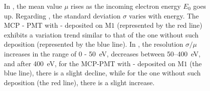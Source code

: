 \begin{figure}[!ht]
\begin{subfigure}[b]{0.5\textwidth}
		\caption{}
		\label{fig:sigmamu}
	\end{subfigure}
	\caption{In , the mean value \(\mu\) rises as the incoming electron energy \(E_0\) goes up. Regarding , the standard deviation \(\sigma\) varies with energy. The MCP - PMT with - deposited on \(\mathrm{M}1\) (represented by the red line) exhibits a variation trend similar to that of the one without such deposition (represented by the blue line). In , the resolution \(\sigma/\mu\) increases in the range of 0 - \SI{50}{eV}, decreases between 50--\SI{400}{eV}, and after \SI{400}{eV}, for the MCP-PMT with - deposited on \(\mathrm{M}1\) (the blue line), there is a slight decline, while for the one without such deposition (the red line), there is a slight increase.
	}
	\label{fig:gaintest}
\end{figure}

